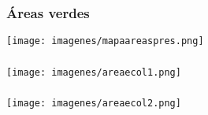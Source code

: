 \documentclass[compress]{beamer}
\begin{document}
{

\begin{frame}
\frametitle{Áreas verdes}
\begin{center}
\texttt{[image: imagenes/mapaareaspres.png]}\\
\end{center}
\end{frame}
}

{
\begin{frame}
\frametitle{}
\vspace{-0.5cm}

\begin{center}
\hspace*{-1cm}\texttt{[image: imagenes/areaecol1.png]}\\

\end{center}

\end{frame}
}
{
\begin{frame}
\frametitle{}
\vspace{-0.5cm}

\begin{center}
\hspace*{-1cm}\texttt{[image: imagenes/areaecol2.png]}\\

\end{center}

\end{frame}
}
\end{document}
